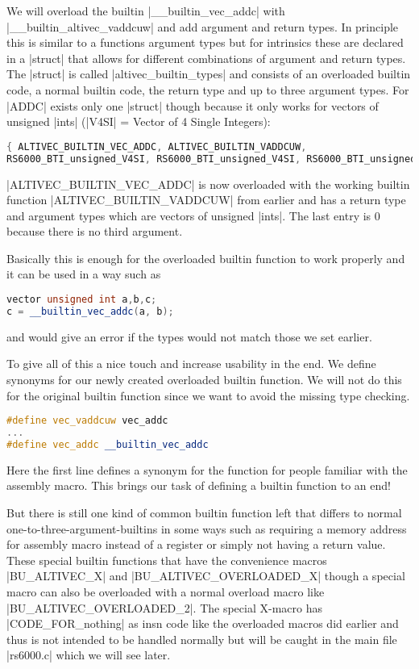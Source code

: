 We will overload the builtin |__builtin_vec_addc| with |__builtin_altivec_vaddcuw| and add argument and return types. In principle this is similar to a functions argument types but for intrinsics these are declared in a |struct| that allows for different combinations of argument and return types. The |struct| is called |altivec_builtin_types| and consists of an overloaded builtin code, a normal builtin code, the return type and up to three argument types. For |ADDC| exists only one |struct| though because it only works for vectors of unsigned |ints| (|V4SI| = Vector of 4 Single Integers):
\begin{lstlisting}[language=C++,basicstyle=\ttfamily\scriptsize,keywordstyle=\color{red}]
{ ALTIVEC_BUILTIN_VEC_ADDC, ALTIVEC_BUILTIN_VADDCUW,
RS6000_BTI_unsigned_V4SI, RS6000_BTI_unsigned_V4SI, RS6000_BTI_unsigned_V4SI, 0 }			
\end{lstlisting}
|ALTIVEC_BUILTIN_VEC_ADDC| is now overloaded with the working builtin function |ALTIVEC_BUILTIN_VADDCUW| from earlier and has a return type and argument types which are vectors of unsigned |ints|. The last entry is 0 because there is no third argument.

Basically this is enough for the overloaded builtin function to work properly and it can be used in a way such as
\begin{lstlisting}[language=C++,basicstyle=\ttfamily\scriptsize,keywordstyle=\color{red}] 
vector unsigned int a,b,c;
c = __builtin_vec_addc(a, b);
\end{lstlisting}
and would give an error if the types would not match those we set earlier.

To give all of this a nice touch and increase usability in the end. We define synonyms for our newly created overloaded builtin function. We will not do this for the original builtin function since we want to avoid the missing type checking.
\begin{lstlisting}[language=C++,basicstyle=\ttfamily\scriptsize,keywordstyle=\color{red}] 
#define vec_vaddcuw vec_addc
...
#define vec_addc __builtin_vec_addc
\end{lstlisting}
Here the first line defines a synonym for the function for people familiar with the assembly macro.
This brings our task of defining a builtin function to an end!

But there is still one kind of common builtin function left that differs to normal one-to-three-argument-builtins in some ways such as requiring a memory address for assembly macro instead of a register or simply not having a return value. These special builtin functions that have the convenience macros |BU_ALTIVEC_X| and |BU_ALTIVEC_OVERLOADED_X| though a special macro can also be overloaded with a normal overload macro like |BU_ALTIVEC_OVERLOADED_2|.
The special X-macro has |CODE_FOR_nothing| as insn code like the overloaded macros did earlier and thus is not intended to be handled normally but will be caught in the main file |rs6000.c| which we will see later.


